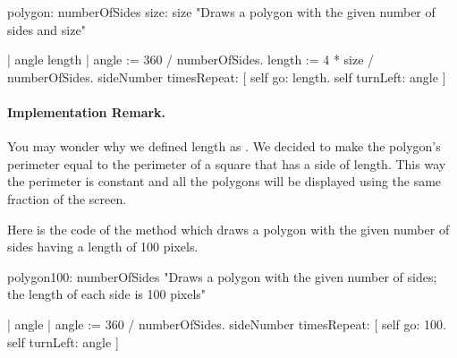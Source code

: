 \begin{method}\label{mth:fixedSizePolygon}
polygon: \newcommand{\replace}[2]{sideNumber}{numberOfSides} size: size
    "Draws a polygon \newcommand{\replace}[2]{of}{with the} given number of sides and size"

    | angle length |
    angle := 360 / \newcommand{\replace}[2]{sideNumber}{numberOfSides}.
    length := 4 * size / \newcommand{\replace}[2]{sideNumber}{numberOfSides}.
    sideNumber timesRepeat: 
                               [ self go: length.
                               self turnLeft: angle ]
\end{method}



\paragraph{Implementation Remark.} You may wonder why we defined \newcommand{\add}[1]{the} length as . We decided to make the \newcommand{\replace}[2]{polygon'}{polygon's} perimeter \newcommand{\replace}[2]{equals}{equal} to the \newcommand{\replace}[2]{one}{perimeter} of a
square \newcommand{\replace}[2]{having}{that has} a side of \newcommand{\remove}[1]{size} length\newcommand{\add}[1]{ \ct{size}}. This way the perimeter is constant \newcommand{\add}[1]{regardless of the \ct{numberOfSides},} and all the polygons will be displayed using \newcommand{\add}[1]{about} the same \newcommand{\replace}[2]{part}{fraction} of the screen. 

Here is the code of the method  which draws a polygon \newcommand{\replace}[2]{of a}{with the} given number of sides\newcommand{\add}[1]{, each side} having a length of 100 pixels.

\begin{method}\label{mth:regularPolygon}
polygon100: \newcommand{\replace}[2]{sideNumber}{numberOfSides}
    "Draws a polygon \newcommand{\replace}[2]{of}{with the} given number of sides\newcommand{\replace}[2]{,}{;} the \newcommand{\replace}[2]{size}{length} of each
    side is 100 pixels"

    | angle |
    angle := 360 / \newcommand{\replace}[2]{sideNumber}{numberOfSides}.
    sideNumber timesRepeat: 
                               [ self go: 100.
                               self turnLeft: angle ]
\end{method}

